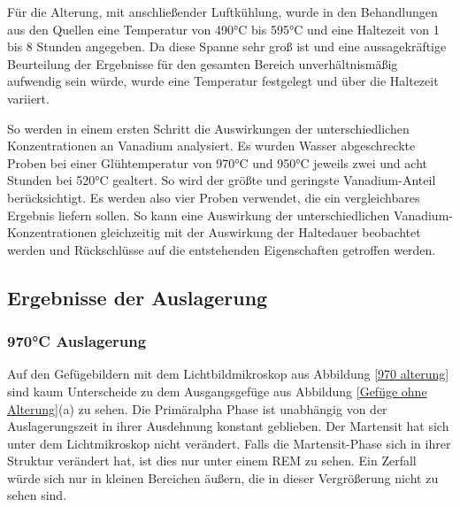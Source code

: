 \documentclass[a4paper, 11pt]{tubsreprt}
\begin{document}
Für die Alterung, mit anschließender Luftkühlung, wurde in den Behandlungen aus den Quellen eine Temperatur von 490°C bis 595°C und eine Haltezeit von 1 bis 8 Stunden angegeben. Da diese Spanne sehr groß ist und eine aussagekräftige Beurteilung der Ergebnisse für den gesamten Bereich unverhältnismäßig aufwendig sein würde, wurde eine Temperatur festgelegt und über die Haltezeit variiert.

So werden in einem ersten Schritt die Auswirkungen der unterschiedlichen Konzentrationen an Vanadium analysiert. Es wurden Wasser abgeschreckte Proben bei einer Glühtemperatur von 970°C und 950°C jeweils zwei und acht Stunden bei 520°C gealtert. So wird der größte und geringste Vanadium-Anteil berücksichtigt. Es werden also vier Proben verwendet, die ein vergleichbares Ergebnis liefern sollen. So kann eine Auswirkung der unterschiedlichen Vanadium-Konzentrationen gleichzeitig mit der Auswirkung der Haltedauer beobachtet werden und Rückschlüsse auf die entstehenden Eigenschaften getroffen werden.
\subsection{Ergebnisse der Auslagerung}
\subsubsection{970°C Auslagerung}
Auf den Gefügebildern mit dem Lichtbildmikroskop aus Abbildung \ref{970 alterung} sind kaum Unterscheide zu dem Ausgangsgefüge aus Abbildung \ref{Gefüge ohne Alterung}(a) zu sehen. Die Primäralpha Phase ist unabhängig von der Auslagerungszeit in ihrer Ausdehnung konstant geblieben. Der Martensit hat sich unter dem Lichtmikroskop nicht verändert. Falls die Martensit-Phase sich in ihrer Struktur verändert hat, ist dies nur unter einem REM zu sehen. Ein Zerfall würde sich nur in kleinen Bereichen äußern, die in dieser Vergrößerung nicht zu sehen sind. 
\end{document}
